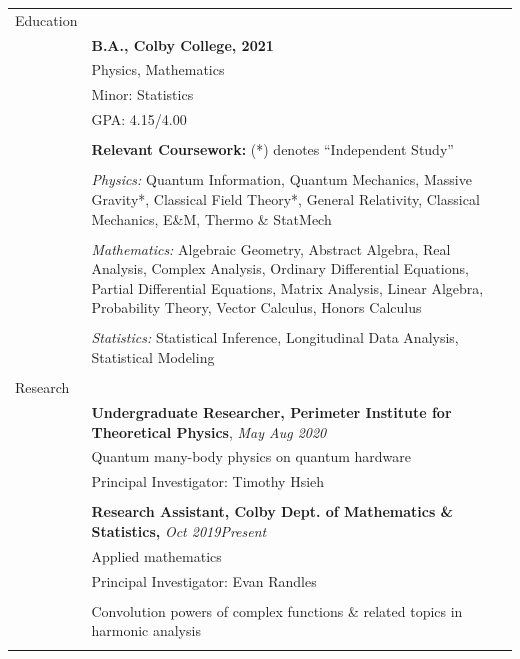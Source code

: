 \documentclass[10pt]{article}
\begin{document}
\noindent \begin{longtable}{ l m{13.5cm}   }

	
  \large{Education}    	& \\ 
  						& \textbf{B.A., Colby College, 2021} \\
     				 	& Physics, Mathematics \\
     				 	& Minor: Statistics  \\
     					& GPA: 4.15/4.00 \\
	 					& \\
	 					& \textbf{Relevant Coursework:} (*) denotes ``Independent Study'' \\ \vspace{-12pt}
	 					& \\
	 					& \textit{Physics:} Quantum Information, Quantum Mechanics, Massive Gravity*, Classical Field Theory*,  General Relativity, Classical Mechanics, E\&M, Thermo \& StatMech\\  \vspace{-9pt}
	 					& \\
	 					& \textit{Mathematics:} Algebraic Geometry, Abstract Algebra, Real Analysis, Complex Analysis, Ordinary Differential Equations, Partial Differential Equations, Matrix Analysis, Linear Algebra, Probability Theory, Vector Calculus, Honors Calculus\\   \vspace{-9pt}
	 					& \\ 
	 					& \textit{Statistics:} Statistical Inference, Longitudinal Data Analysis, Statistical Modeling\\
	 					& \\
    
        
  \large{Research}      & \\  
  						& \textbf{Undergraduate Researcher, Perimeter Institute for Theoretical Physics}, \textit{May \textendash Aug 2020}\\
  						& Quantum many-body physics on quantum hardware \\
  						& Principal Investigator: Timothy Hsieh \\
  						& \\
  						
  						& \textbf{Research Assistant, Colby Dept. of Mathematics \& Statistics,} \textit{Oct 2019\textendash Present }\\
  						& Applied mathematics \\
  						& Principal Investigator: Evan Randles  \\ \vspace{-9pt}
  						& \\
  						& Convolution powers of complex functions \& related topics in harmonic analysis \\
  						& \\
  						

\end{longtable}
\end{document}
